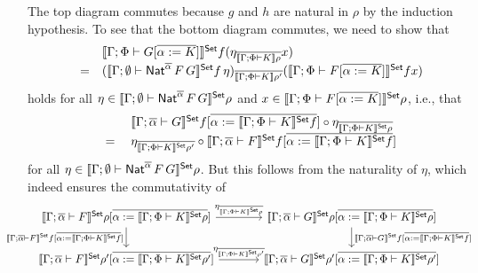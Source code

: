 \documentclass{lmcs}
\theoremstyle{plain}\newtheorem{satz}[thm]{Satz}
\begin{document}
{\begin{itemize}
\noindent
The top diagram commutes because $g$ and $h$ are natural in $\rho$ by
the induction hypothesis.
To see that the bottom diagram commutes,
we need to show that
\[\begin{array}{ll}
& \llbracket{\Gamma;\Phi \vdash G [\overline{\alpha := K}]}\rrbracket^{\mathsf{Set}}f
(\eta_{\overline{\llbracket{\Gamma;\Phi \vdash K}\rrbracket\rho}} x)\\
= &
(\llbracket{\Gamma; \emptyset \vdash \mathsf{Nat}^{\overline{\alpha}} \,F \,G}\rrbracket^{\mathsf{Set}} f\, \eta
)_{\overline{\llbracket{\Gamma;\Phi \vdash K}\rrbracket\rho'}}
(\llbracket{\Gamma;\Phi \vdash F [\overline{\alpha := K}]}\rrbracket^{\mathsf{Set}}f x)
\end{array}\]
holds for all $\eta \in \llbracket{\Gamma; \emptyset \vdash
  \mathsf{Nat}^{\overline{\alpha}} \,F \,G}\rrbracket^{\mathsf{Set}}\rho$ and $x \in
\llbracket{\Gamma;\Phi \vdash F [\overline{\alpha := K}]}\rrbracket^{\mathsf{Set}}\rho$,
i.e.,
that
\[\begin{array}{ll}
 & \llbracket{\Gamma; \overline{\alpha} \vdash G}\rrbracket^{\mathsf{Set}} f[\overline{\alpha :=
    \llbracket{\Gamma;\Phi \vdash K}\rrbracket^{\mathsf{Set}} f }] \circ
\eta_{\overline{\llbracket{\Gamma;\Phi \vdash K}\rrbracket^{\mathsf{Set}}\rho}} \\ 
=\;&
\eta_{\overline{\llbracket{\Gamma;\Phi \vdash K}\rrbracket^{\mathsf{Set}}\rho'}}
\circ
\llbracket{\Gamma; \overline{\alpha} \vdash F}\rrbracket^{\mathsf{Set}} f [\overline{\alpha := \llbracket{\Gamma;\Phi \vdash K}\rrbracket^{\mathsf{Set}}f}]
\end{array}\]
for all $\eta \in \llbracket{\Gamma;\emptyset \vdash
  \mathsf{Nat}^{\overline{\alpha}} \,F \,G}\rrbracket^{\mathsf{Set}}\rho$.
But this follows from the naturality of $\eta$, which indeed ensures
the commutativity of 
{\footnotesize
\[\hspace*{-0.3in}\begin{tikzcd}[column sep = large]
\setsem{\Gamma; \ol{\alpha} \vdash F}\rho[\ol{\alpha :=
    \setsem{\Gamma;\Phi \vdash K}\rho}] \ar[r,
  "{\;\;\;\eta_{\ol{\setsem{\Gamma;\Phi \vdash K}\rho}}\;\;\; }"]
\ar[d, "{\setsem{\Gamma; \ol{\alpha} \vdash F} f [\ol{\alpha := 
        \setsem{\Gamma;\Phi \vdash K}f}]}"']
& \setsem{\Gamma;
  \ol{\alpha} \vdash G}\rho[\ol{\alpha := \setsem{\Gamma;\Phi \vdash
      K}\rho}]
\ar[d, "{\setsem{\Gamma; \ol{\alpha} \vdash G} f [\ol{\alpha := 
        \setsem{\Gamma;\Phi \vdash K}f}]}"]\\
\setsem{\Gamma; \ol{\alpha} \vdash F}\rho'[\ol{\alpha :=
    \setsem{\Gamma;\Phi \vdash K}\rho'}] \ar[r,
  "{\eta_{\ol{\setsem{\Gamma;\Phi \vdash K}\rho'}} }"]
& \setsem{\Gamma; \ol{\alpha} \vdash G}\rho'[\ol{\alpha :=
    \setsem{\Gamma;\Phi \vdash K}\rho'}]
\end{tikzcd}\]}


\end{itemize}}
\end{document}
